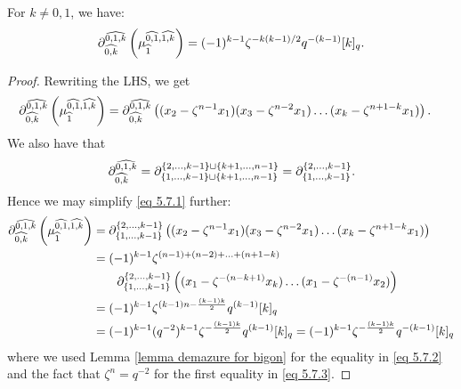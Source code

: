 \begin{corollary}\label{corollary- bigon bursting}
For $k \not= 0,1$, we have:
    $$\partial_{\widehat{0,k}}^{\widehat{0,1,k}}\left(\mu_{\widehat{1}}^{\widehat{0,1},\widehat{1,k}}\right)=(-1)^{k-1}\zeta^{-k(k-1)/2}q^{-(k-1)}[k]_q.$$
    \begin{proof}
        Rewriting the LHS, we get
        \begin{align}
        \partial_{\widehat{0,k}}^{\widehat{0,1,k}}\left(\mu_{\widehat{1}}^{\widehat{0,1},\widehat{1,k}}\right)&=\partial_{\widehat{0,k}}^{\widehat{0,1,k}}\left( (x_2-\zeta^{n-1}x_1)(x_3-\zeta^{n-2}x_1)\ldots (x_k-\zeta^{n+1-k}x_1)\right). \label{eq 5.7.1}
        \end{align}
        We also have that 
        \[\partial_{\widehat{0,k}}^{\widehat{0,1,k}}=\partial_{\{1,\ldots, k-1\}\sqcup\{k+1,\ldots, n-1\}}^{\{2,\ldots, k-1\}\sqcup \{k+1, \ldots, n-1\}}=\partial_{\{1,\ldots, k-1\}}^{\{2,\ldots, k-1\}}.\]
       Hence we may simplify \eqref{eq 5.7.1} further:
       \begin{align}
        \partial_{\widehat{0,k}}^{\widehat{0,1,k}}\left(\mu_{\widehat{1}}^{\widehat{0,1},\widehat{1,k}}\right)&=\partial_{\{1,\ldots, k-1\}}^{\{2,\ldots, k-1\}}\left( (x_2-\zeta^{n-1}x_1)(x_3-\zeta^{n-2}x_1)\ldots (x_k-\zeta^{n+1-k}x_1)\right) \nonumber\\
        &= (-1)^{k-1}\zeta^{(n-1)+(n-2)+\ldots + (n+1-k)}
        \\&\hspace{20pt}\partial_{\{1,\ldots, k-1\}}^{\{2,\ldots, k-1\}}\left((x_1-\zeta^{-(n-k+1)}x_k)\ldots (x_1-\zeta^{-(n-1)}x_2)\right)\nonumber\\
        &=(-1)^{k-1}\zeta^{(k-1)n-\frac{(k-1)k}{2}}q^{(k-1)}[k]_q \label{eq 5.7.2}\\
        &=(-1)^{k-1}(q^{-2})^{k-1}\zeta^{-\frac{(k-1)k}{2}}q^{(k-1)}[k]_q = (-1)^{k-1}\zeta^{-\frac{(k-1)k}{2}}q^{-(k-1)}[k]_q \label{eq 5.7.3}
        \end{align}
        where we used Lemma \ref{lemma demazure for bigon} for the equality in \eqref{eq 5.7.2} and the fact that $\zeta^n=q^{-2}$ for the first equality in \eqref{eq 5.7.3}. 
    \end{proof}
\end{corollary}


